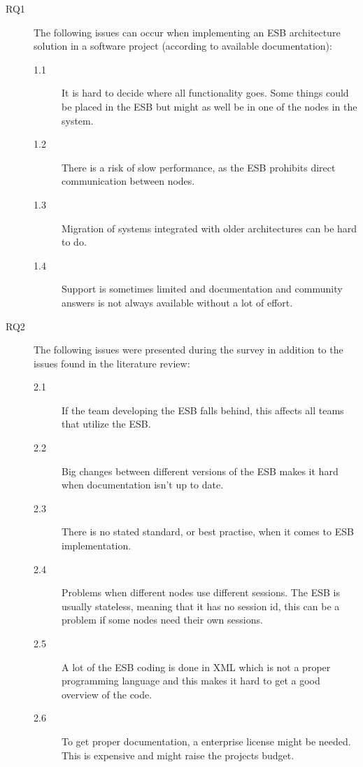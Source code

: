 \documentclass{llncs}
\begin{document}
\begin{description}

\item[RQ1] The following issues can occur when implementing an ESB architecture solution in a software project (according to available documentation):
\begin{description}
\item[1.1] It is hard to decide where all functionality goes. Some things could be placed in the ESB but might as well be in one of the nodes in the system.
\item[1.2] There is a risk of slow performance, as the ESB prohibits direct communication between nodes.
\item[1.3] Migration of systems integrated with older architectures can be hard to do.
\item[1.4] Support is sometimes limited and documentation and community answers is not always available without a lot of effort.
\end{description}

\item[RQ2] The following issues were presented during the survey in addition to the issues found in the literature review:
\begin{description}
\item[2.1] If the team developing the ESB falls behind, this affects all teams that utilize the ESB.
\item[2.2] Big changes between different versions of the ESB makes it hard when documentation isn't up to date.
\item[2.3] There is no stated standard, or best practise, when it comes to ESB implementation.
\item[2.4] Problems when different nodes use different sessions. The ESB is usually stateless, meaning that it has no session id, this can be a problem if some nodes need their own sessions.
\item[2.5] A lot of the ESB coding is done in XML which is not a proper programming language and this makes it hard to get a good overview of the code. 
\item[2.6] To get proper documentation, a enterprise license might be needed. This is expensive and might raise the projects budget.
\end{description}


\end{description}
\end{document}
